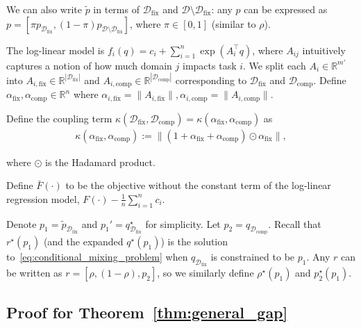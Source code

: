 \documentclass[table]{ai2style/ai2}
\newcommand{\D}[0]{\mathcal{D}}
\newcommand{\R}[0]{\mathbb{R}}
\newcommand{\Dfix}[0]{\mathcal{D}_{\text{fix}}}
\newcommand{\Dcomp}[0]{\mathcal{D}_{\text{comp}}}
\newcommand{\alphafix}[0]{\alpha_{\text{fix}}}
\newcommand{\alphacomp}[0]{\alpha_{\text{comp}}}
\newcommand{\fix}[0]{\text{fix}}
\newcommand{\comp}[0]{\text{comp}}
\begin{document}
We can also write $\tilde{p}$ in terms of $\Dfix$ and $\D \setminus \Dfix$: any $p$ can be expressed as $p = [\pi p_{\Dfix}, (1 - \pi) p_{\D \setminus \Dfix}]$, where $\pi \in [0, 1]$ (similar to $\rho$).

The log-linear model is $f_i(q) = c_i + \sum_{i = 1}^n \exp(A_i^\top q)$, where $A_{ij}$ intuitively captures a notion of how much domain $j$ impacts task $i$. We split each $A_i \in \R^{m'}$ into $A_{i, \fix} \in \R^{|\Dfix|}$ and $A_{i,\comp} \in \R^{|\Dcomp|}$ corresponding to $\Dfix$ and $\Dcomp$. Define $\alphafix, \alphacomp \in \R^n$ where $\alpha_{i, \fix} = \|A_{i, \fix}\|, \alpha_{i, \comp} = \|A_{i, \comp} \|$. 

Define the coupling term $\kappa(\Dfix, \Dcomp) = \kappa(\alphafix, \alphacomp)$ as
\begin{align}
    \kappa(\alphafix, \alphacomp) := \|(1 + \alphafix + \alphacomp) \odot \alphafix \|,
\end{align}

where $\odot$ is the Hadamard product.

Define $\bar{F}(\cdot)$ to be the objective without the constant term of the log-linear regression model, $F(\cdot) - \frac{1}{n}\sum_{i =1 }^n c_i$.

Denote $p_1 = \tilde{p}_{\Dfix}$ and $p_1' = q^\star_{\Dfix}$ for simplicity. Let $p_2 = q_{\Dcomp}$. Recall that $r^\star(p_1)$ (and the expanded $q^\star(p_1)$) is the solution to~\eqref{eq:conditional_mixing_problem} when $q_{\Dfix}$ is constrained to be $p_1$. 
Any $r$ can be written as $r = [\rho, (1 - \rho), p_2]$, so we similarly define $\rho^\star(p_1)$ and $p_2^\star(p_1)$.

\subsection{Proof for Theorem~\ref{thm:general_gap}}\label{supp:general_gap_proof}
\end{document}
